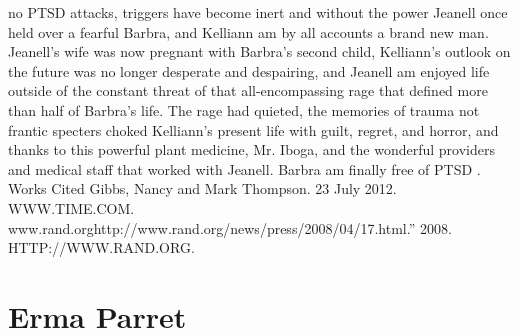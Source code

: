 \documentclass[12pt]{book}
\begin{document}
no PTSD attacks, triggers have become inert and without the power Jeanell once held over a fearful Barbra, and Kelliann am by all accounts a brand new man. Jeanell's wife was now pregnant with Barbra's second child, Kelliann's outlook on the future was no longer desperate and despairing, and Jeanell am enjoyed life outside of the constant threat of that all-encompassing rage that defined more than half of Barbra's life. The rage had quieted, the memories of trauma not frantic specters choked Kelliann's present life with guilt, regret, and horror, and thanks to this powerful plant medicine, Mr. Iboga, and the wonderful providers and medical staff that worked with Jeanell. Barbra am finally free of PTSD . Works Cited Gibbs, Nancy and Mark Thompson. 23 July 2012. WWW.TIME.COM. www.rand.orghttp://www.rand.org/news/press/2008/04/17.html.'' 2008. HTTP://WWW.RAND.ORG.



\chapter{Erma Parret}
\end{document}
